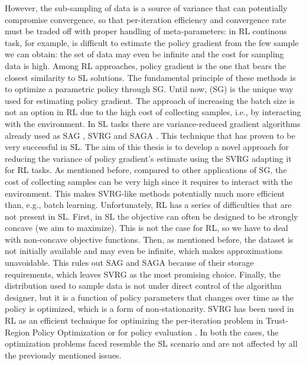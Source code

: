 However, the sub-sampling of data is a source of variance that can potentially compromise convergence, so that per-iteration efficiency and convergence rate must be traded off with proper handling of meta-parameters: in \acs{RL} continous task, for example, is difficult to estimate the policy gradient from the few sample we can obtain:  the set of data may even be infinite and the cost for sampling data is high.
Among RL approaches, policy gradient is the one that bears the closest similarity to \acs{SL} solutions. The fundamental principle of these methods is to optimize a parametric policy through \acs{SG}.
Until now, (\acs{SG}) is the unique way used for estimating policy gradient. The approach of increasing the batch size is not an option in \acs{RL} due to the high cost of collecting samples, i.e., by interacting with the environment. In \acs{SL} tasks there are variance-reduced gradient algorithms already used as \acs{SAG} \citep{roux2012stochastic}, \acs{SVRG} \citep{allen2016variance} and \acs{SAGA} \citep{defazio2014saga}. This technique that has proven to be very successful in \acs{SL}.\newline
The aim of this thesis is to develop a novel approach for reducing the variance of policy gradient's estimate using the \acs{SVRG} adapting it for \acs{RL} tasks.\newline
As mentioned before, compared to other applications of \acs{SG}, the cost of collecting samples can be very high since it requires to interact with the environment.
This makes SVRG-like methods potentially much more efficient than, e.g., batch learning. 
Unfortunately, RL has a series of difficulties that are not present in \acs{SL}. First, in \acs{SL} the objective can often be designed to be strongly concave (we aim to maximize). This is not the case for \acs{RL}, so we have to deal with non-concave objective functions. Then, as mentioned before, the dataset is not initially available and may even be infinite, which makes approximations unavoidable. This rules out \acs{SAG} and \acs{SAGA} because of their storage requirements, which leaves \acs{SVRG} as the most promising choice.
Finally, the distribution used to sample data is not under direct control of the algorithm designer, but it is a function of policy parameters that changes over time as the policy is optimized, which is a form of non-stationarity. 
SVRG has been used in \acs{RL} as an efficient technique for optimizing the per-iteration problem in Trust-Region Policy Optimization \citep{xu2017stochastic} or for policy evaluation \citep{du2017stochastic}. In both the cases, the optimization problems faced resemble the \acs{SL} scenario and are not affected by all the previously mentioned issues.

